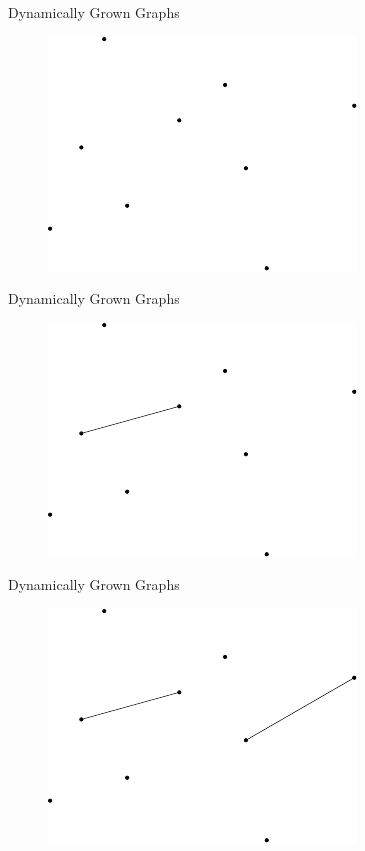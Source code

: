 \documentclass{beamer}
\begin{document}
\begin{frame}{Dynamically Grown Graphs}
        \begin{figure}[H]
                \centering
                \includegraphics[scale=1]{fig/graph-1.pdf}
        \end{figure}
\end{frame}
\begin{frame}{Dynamically Grown Graphs}
        \begin{figure}[H]
                \centering
                \includegraphics[scale=1]{fig/graph-2.pdf}
        \end{figure}
\end{frame}
\begin{frame}{Dynamically Grown Graphs}
        \begin{figure}[H]
                \centering
                \includegraphics[scale=1]{fig/graph-3.pdf}
        \end{figure}
\end{frame}
\end{document}
